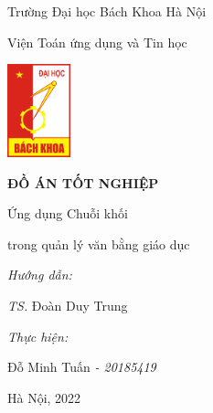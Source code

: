 \begin{titlepage}
    \centering
    \vspace{0.25cm}
    {\large Trường Đại học Bách Khoa Hà Nội\par}
    \vspace{0.25cm}
    {\normalsize Viện Toán ứng dụng và Tin học\par}
    \vspace{0.75cm}
    {\includegraphics[width=69px]{anh/hust-logo.png}\par}
    \vspace{1cm}
    {\Large\textbf{ĐỒ ÁN TỐT NGHIỆP}\par}
    \vspace{1.5cm}
    {\large Ứng dụng Chuỗi khối\par}
    \vspace{0.25cm}
    {\large trong quản lý văn bằng giáo dục\par}
    \vspace{1.25cm}
    \begin{flushleft}
        \hspace{3cm}
        {\normalsize\textit{Hướng dẫn:}\par}
        \vspace{0.125cm}
        \hspace{5cm}
        {\normalsize \textit{TS.} Đoàn Duy Trung\par}
        \vspace{0.125cm}
        \hspace{3cm}
        {\normalsize\textit{Thực hiện:}\par}
        \vspace{0.125cm}
        \hspace{5cm}
        {\normalsize Đỗ Minh Tuấn \textit{- 20185419}\par}
    \end{flushleft}
    \vspace{3cm}
    {\normalsize Hà Nội, 2022\par}
    \vspace{0.5cm}
\end{titlepage}